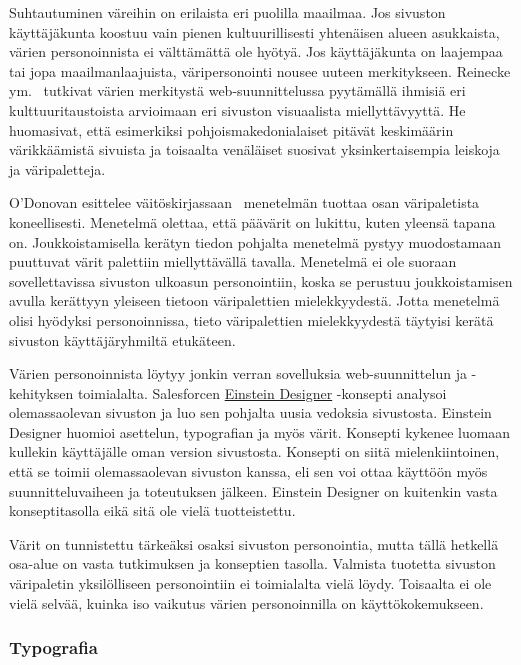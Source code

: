 \documentclass[finnish, 12pt, a4paper, elec, utf8, a-1b, online]{aaltothesis}
\begin{document}
Suhtautuminen väreihin on erilaista eri puolilla maailmaa. Jos sivuston
käyttäjäkunta koostuu vain pienen kultuurillisesti yhtenäisen alueen asukkaista,
värien personoinnista ei välttämättä ole hyötyä. Jos käyttäjäkunta on laajempaa
tai jopa maailmanlaajuista, väripersonointi nousee uuteen merkitykseen. Reinecke
ym.~\cite{10.1145/2556288.2557052} tutkivat värien merkitystä web-suunnittelussa
pyytämällä ihmisiä eri kulttuuritaustoista arvioimaan eri sivuston visuaalista
miellyttävyyttä. He huomasivat, että esimerkiksi pohjoismakedonialaiset pitävät
keskimäärin värikkäämistä sivuista ja toisaalta venäläiset suosivat
yksinkertaisempia leiskoja ja väripaletteja.

O'Donovan esittelee väitöskirjassaan~\cite{odonovan_2015} menetelmän tuottaa
osan väripaletista koneellisesti. Menetelmä olettaa, että päävärit on lukittu,
kuten yleensä tapana on. Joukkoistamisella kerätyn tiedon pohjalta menetelmä
pystyy muodostamaan puuttuvat värit palettiin miellyttävällä tavalla. Menetelmä
ei ole suoraan sovellettavissa sivuston ulkoasun personointiin, koska se
perustuu joukkoistamisen avulla kerättyyn yleiseen tietoon väripalettien
mielekkyydestä. Jotta menetelmä olisi hyödyksi personoinnissa, tieto
väripalettien mielekkyydestä täytyisi kerätä sivuston käyttäjäryhmiltä
etukäteen.

Värien personoinnista löytyy jonkin verran sovelluksia web-suunnittelun ja
-kehityksen toimialalta. Salesforcen
\href{https://medium.com/salesforce-ux/einstein-designer-ai-powered-personalized-design-at-scale-367d71b85a3d}{Einstein
    Designer} -konsepti analysoi olemassaolevan sivuston ja luo sen pohjalta
uusia vedoksia sivustosta. Einstein Designer huomioi asettelun, typografian ja
myös värit. Konsepti kykenee luomaan kullekin käyttäjälle oman version
sivustosta. Konsepti on siitä mielenkiintoinen, että se toimii olemassaolevan
sivuston kanssa, eli sen voi ottaa käyttöön myös suunnitteluvaiheen ja
toteutuksen jälkeen. Einstein Designer on kuitenkin vasta konseptitasolla eikä
sitä ole vielä tuotteistettu.

Värit on tunnistettu tärkeäksi osaksi sivuston personointia, mutta tällä
hetkellä osa-alue on vasta tutkimuksen ja konseptien tasolla. Valmista tuotetta
sivuston väripaletin yksilölliseen personointiin ei toimialalta vielä löydy.
Toisaalta ei ole vielä selvää, kuinka iso vaikutus värien personoinnilla on
käyttökokemukseen.

\subsubsection{Typografia}
\end{document}
